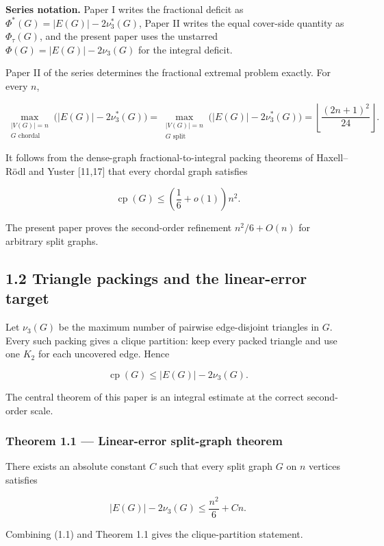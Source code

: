 \documentclass[
  american,
  11pt,
  a4paper,
]{article}
\begin{document}
\textbf{Series notation.} Paper I writes the fractional deficit as \(\Phi^*(G)=|E(G)|-2\nu_3^*(G)\), Paper II writes the equal cover-side quantity as \(\Phi_\tau(G)\), and the present paper uses the unstarred \(\Phi(G)=|E(G)|-2\nu_3(G)\) for the integral deficit.

Paper II of the series determines the fractional extremal problem exactly. For every \(n\),

\[
\max_{\substack{|V(G)|=n\\G\text{ chordal}}}
\bigl(|E(G)|-2\nu_3^*(G)\bigr)
=
\max_{\substack{|V(G)|=n\\G\text{ split}}}
\bigl(|E(G)|-2\nu_3^*(G)\bigr)
=
\left\lfloor\frac{(2n+1)^2}{24}\right\rfloor.
\]

It follows from the dense-graph fractional-to-integral packing theorems of Haxell--Rödl and Yuster {[}11,17{]} that every chordal graph satisfies

\[
\operatorname{cp}(G)
\le
\left(\frac16+o(1)\right)n^2.
\]

The present paper proves the second-order refinement \(n^2/6+O(n)\) for arbitrary split graphs.

\subsection{1.2 Triangle packings and the linear-error target}\label{triangle-packings-and-the-linear-error-target}

Let \(\nu_3(G)\) be the maximum number of pairwise edge-disjoint triangles in \(G\). Every such packing gives a clique partition: keep every packed triangle and use one \(K_2\) for each uncovered edge. Hence

\[
\operatorname{cp}(G)
\le
|E(G)|-2\nu_3(G).
\tag{1.1}
\]

The central theorem of this paper is an integral estimate at the correct second-order scale.

\subsubsection{Theorem 1.1 --- Linear-error split-graph theorem}\label{theorem-1.1-linear-error-split-graph-theorem}

There exists an absolute constant \(C\) such that every split graph \(G\) on \(n\) vertices satisfies

\[
\boxed{
|E(G)|-2\nu_3(G)
\le
\frac{n^2}{6}+Cn.
}
\tag{1.2}
\]

Combining (1.1) and Theorem 1.1 gives the clique-partition statement.
\end{document}
